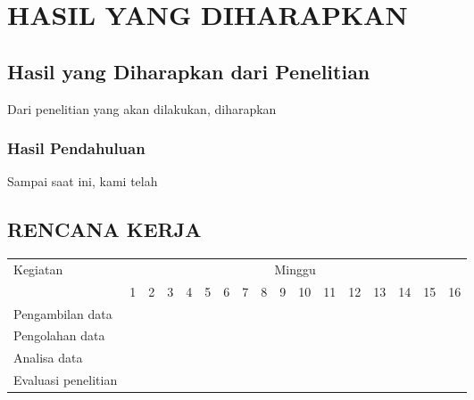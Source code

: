 \chapter{HASIL YANG DIHARAPKAN}

\section{Hasil yang Diharapkan dari Penelitian}

Dari penelitian yang akan dilakukan, diharapkan \lipsum[15]

\subsection{Hasil Pendahuluan}

Sampai saat ini, kami telah \lipsum[16]

\section{RENCANA KERJA}

\newcommand{\w}{}
\newcommand{\G}{\cellcolor{gray}}
\begin{table}[h!]
  \begin{tabular}{|p{3.5cm}|c|c|c|c|c|c|c|c|c|c|c|c|c|c|c|c|}

    \hline
    \multirow{2}{*}{Kegiatan} & \multicolumn{16}{|c|}{Minggu} \\
    \cline{2-17} &
    1 & 2 & 3 & 4 & 5 & 6 & 7 & 8 & 9 & 10 & 11 & 12 & 13 & 14 & 15 & 16 \\
    \hline

    Pengambilan data &
    \G & \G & \G & \G & \w & \w & \w & \w & \w & \w & \w & \w & \w & \w & \w & \w \\
    \hline

    Pengolahan data &
    \w & \w & \w & \w & \G & \G & \G & \G & \w & \w & \w & \w & \w & \w & \w & \w \\
    \hline

    Analisa data &
    \w & \w & \w & \w & \w & \w & \w & \w & \G & \G & \G & \G & \w & \w & \w & \w \\
    \hline

    Evaluasi penelitian &
    \w & \w & \w & \w & \w & \w & \w & \w & \w & \w & \w & \w & \G & \G & \G & \G \\
    \hline

  \end{tabular}
\end{table}

